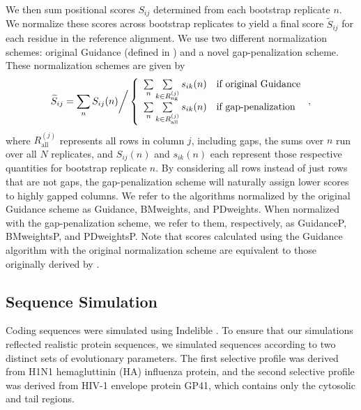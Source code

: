 \documentclass[11pt]{article}
\begin{document}
We then sum positional scores $S_{ij}$ determined from each bootstrap replicate $n$. We normalize these scores across bootstrap replicates to yield a final score $\widetilde{S}_{ij}$ for each residue in the reference alignment. We use two different normalization schemes: original Guidance (defined in \citet{Penn2010}) and a novel gap-penalization scheme. These normalization schemes are given by \begin{equation}
\widetilde{S}_{ij}  = \sum_n S_{ij}(n) \bigg{/} \left\{ \begin{array}{rl}

              \sum\limits_n \sum\limits_{k \in R_\text{ng}^{(j)}} s_{ik}(n)     &\mbox{if original Guidance} \\
              \sum\limits_n \sum\limits_{k \in R_\text{all}^{(j)}} s_{ik}(n)     &\mbox{if gap-penalization} \\      
        \end{array} \right.,
\end{equation} 
where $R_\text{all}^{(j)}$ represents all rows in column $j$, including gaps, the sums over $n$ run over all $N$ replicates, and $S_{ij}(n)$ and $s_{ik}(n)$ each represent those respective quantities for bootstrap replicate $n$. By considering all rows instead of just rows that are not gaps, the gap-penalization scheme will naturally assign lower scores to highly gapped columns. We refer to the algorithms normalized by the original Guidance scheme as Guidance, BMweights, and PDweights. When normalized with the gap-penalization scheme, we refer to them, respectively, as GuidanceP, BMweightsP, and PDweightsP. Note that scores calculated using the Guidance algorithm with the original normalization scheme are equivalent to those originally derived by \citet{Penn2010}. 



\subsection*{Sequence Simulation}
Coding sequences were simulated using Indelible \citep{Fletcher2009}. To ensure that our simulations reflected realistic protein sequences, we simulated sequences according to two distinct sets of evolutionary parameters. The first selective profile was derived from H1N1 hemagluttinin (HA) influenza protein, and the second selective profile was derived from HIV-1 envelope protein GP41, which contains only the cytosolic and tail regions. 
\end{document}
